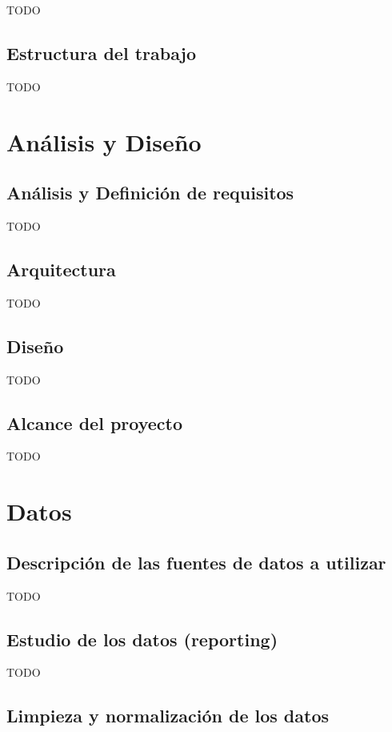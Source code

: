 \documentclass[]{article}
\begin{document}
TODO

\subsection{Estructura del trabajo}

TODO

\section{Análisis y Diseño}

\subsection{Análisis y Definición de requisitos}

TODO

\subsection{Arquitectura}

TODO

\subsection{Diseño}

TODO

\subsection{Alcance del proyecto}

TODO


\section{Datos}

\subsection{Descripción de las fuentes de datos a utilizar}

TODO

\subsection{Estudio de los datos (reporting)}

TODO

\subsection{Limpieza y normalización de los datos}
\end{document}
